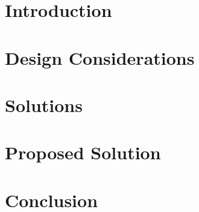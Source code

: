 \documentclass[12pt, a4paper]{article}
\title{\thetitle}
\author{\theauthor}
\date{\today}
\begin{document}
\maketitle
\thispagestyle{empty}

\section{Introduction}

\section{Design Considerations}

\section{Solutions}

\section{Proposed Solution}

\section{Conclusion}
\end{document}
